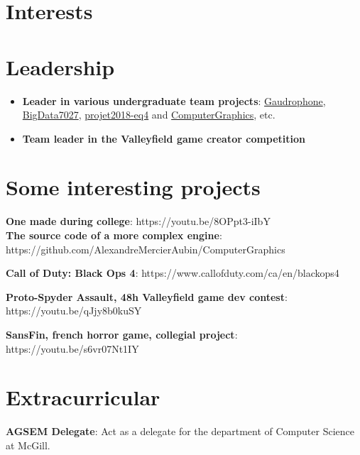 \documentclass[10pt]{article} %
\begin{document}
\section{Interests}


\section{Leadership}
\begin{itemize}
\item \textbf{Leader in various undergraduate team projects}: \href{https://github.com/AlexandreMercierAubin/Gaudrophone}{Gaudrophone}, \href{https://github.com/AlexandreMercierAubin/BigData7027}{BigData7027}, \href{https://github.com/AlexandreMercierAubin/projet2018-eq4}{projet2018-eq4} and \href{https://github.com/AlexandreMercierAubin/ComputerGraphics}{ComputerGraphics}, etc. \\ 
\item \textbf{Team leader in the Valleyfield game creator competition}
\end{itemize}

\section{Some interesting projects}

{
\textbf{One made during college}: https://youtu.be/8OPpt3-iIbY\\
\textbf{The source code of a more complex engine}: https://github.com/AlexandreMercierAubin/ComputerGraphics\\

}

{
\textbf{Call of Duty: Black Ops 4}: https://www.callofduty.com/ca/en/blackops4

\textbf{Proto-Spyder Assault, 48h Valleyfield game dev contest}: https://youtu.be/qJjy8b0kuSY

\textbf{SansFin, french horror game, collegial project}: https://youtu.be/s6vr07Nt1IY
}

\section{Extracurricular}
\textbf{AGSEM Delegate}: Act as a delegate for the department of Computer Science at McGill.
\end{document}
